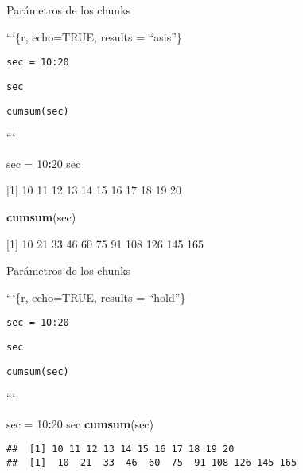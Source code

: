 \documentclass[ignorenonframetext,]{beamer}
\newenvironment{Shaded}{\begin{snugshade}}{\end{snugshade}}
\newcommand{\DecValTok}[1]{\textcolor[rgb]{0.00,0.00,0.81}{#1}}
\newcommand{\KeywordTok}[1]{\textcolor[rgb]{0.13,0.29,0.53}{\textbf{#1}}}
\newcommand{\NormalTok}[1]{#1}
\newcommand{\OperatorTok}[1]{\textcolor[rgb]{0.81,0.36,0.00}{\textbf{#1}}}
\newcommand{\StringTok}[1]{\textcolor[rgb]{0.31,0.60,0.02}{#1}}
\begin{document}
\begin{frame}[fragile]{Parámetros de los chunks}
\protect\hypertarget{parametros-de-los-chunks-8}{}

```\{r, echo=TRUE, results = ``asis''\}

\texttt{sec\ =\ 10:20}

\texttt{sec}

\texttt{cumsum(sec)}

```

\n

\begin{Shaded}
\begin{Highlighting}[]
\NormalTok{sec =}\StringTok{ }\DecValTok{10}\OperatorTok{:}\DecValTok{20}
\NormalTok{sec}
\end{Highlighting}
\end{Shaded}

{[}1{]} 10 11 12 13 14 15 16 17 18 19 20

\begin{Shaded}
\begin{Highlighting}[]
\KeywordTok{cumsum}\NormalTok{(sec)}
\end{Highlighting}
\end{Shaded}

{[}1{]} 10 21 33 46 60 75 91 108 126 145 165

\end{frame}

\begin{frame}[fragile]{Parámetros de los chunks}
\protect\hypertarget{parametros-de-los-chunks-9}{}

```\{r, echo=TRUE, results = ``hold''\}

\texttt{sec\ =\ 10:20}

\texttt{sec}

\texttt{cumsum(sec)}

```

\n

\begin{Shaded}
\begin{Highlighting}[]
\NormalTok{sec =}\StringTok{ }\DecValTok{10}\OperatorTok{:}\DecValTok{20}
\NormalTok{sec}
\KeywordTok{cumsum}\NormalTok{(sec)}
\end{Highlighting}
\end{Shaded}

\begin{verbatim}
##  [1] 10 11 12 13 14 15 16 17 18 19 20
##  [1]  10  21  33  46  60  75  91 108 126 145 165
\end{verbatim}

\end{frame}
\end{document}
